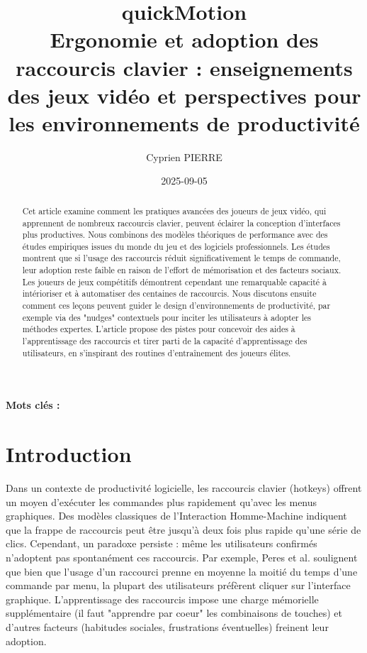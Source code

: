 \documentclass[a4paper,12pt]{article}
\author{Cyprien PIERRE \orcidlink{0009-0009-9040-6795}}
\date{2025-09-05}
\title{quickMotion\\\medskip
\large Ergonomie et adoption des raccourcis clavier : enseignements des jeux vidéo et perspectives pour les environnements de productivité}
\begin{document}
\maketitle
\begin{abstract}
Cet article examine comment les pratiques avancées des joueurs de jeux vidéo, qui apprennent de nombreux raccourcis clavier, peuvent éclairer la conception d’interfaces plus productives. Nous combinons des modèles théoriques de performance avec des études empiriques issues du monde du jeu et des logiciels professionnels. Les études montrent que si l’usage des raccourcis réduit significativement le temps de commande, leur adoption reste faible en raison de l’effort de mémorisation et des facteurs sociaux\autocite{peresKeyboardShortcutUsage2004,raursoIntermodalImprovementNudging2020}. Les joueurs de jeux compétitifs démontrent cependant une remarquable capacité à intérioriser et à automatiser des centaines de raccourcis\autocite{huangMasterMakerUnderstanding2017}. Nous discutons ensuite comment ces leçons peuvent guider le design d’environnements de productivité, par exemple via des "nudges" contextuels pour inciter les utilisateurs à adopter les méthodes expertes\autocite{raursoIntermodalImprovementNudging2020}. L’article propose des pistes pour concevoir des aides à l’apprentissage des raccourcis et tirer parti de la capacité d’apprentissage des utilisateurs, en s’inspirant des routines d’entraînement des joueurs élites.
\end{abstract}

\textbf{Mots clés : }
\section{Introduction}
\label{sec:orgc95e067}
Dans un contexte de productivité logicielle, les raccourcis clavier (hotkeys) offrent un moyen d’exécuter les commandes plus rapidement qu’avec les menus graphiques. Des modèles classiques de l’Interaction Homme-Machine indiquent que la frappe de raccourcis peut être jusqu’à deux fois plus rapide qu’une série de clics\autocite{peresKeyboardShortcutUsage2004,raursoIntermodalImprovementNudging2020}. Cependant, un paradoxe persiste : même les utilisateurs confirmés n’adoptent pas spontanément ces raccourcis. Par exemple, Peres et al. soulignent que bien que l’usage d’un raccourci prenne en moyenne la moitié du temps d’une commande par menu, la plupart des utilisateurs préfèrent cliquer sur l'interface graphique\autocite{peresKeyboardShortcutUsage2004}. L’apprentissage des raccourcis impose une charge mémorielle supplémentaire (il faut "apprendre par coeur" les combinaisons de touches) et d'autres facteurs (habitudes sociales, frustrations éventuelles) freinent leur adoption\autocite{peresKeyboardShortcutUsage2004,raursoIntermodalImprovementNudging2020}.
\end{document}
